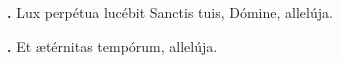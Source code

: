 \textbf{\Vbar.} Lux perpétua lucébit Sanctis tuis, Dómine, allelúja.

\textbf{\Rbar.} Et ætérnitas tempórum, allelúja.